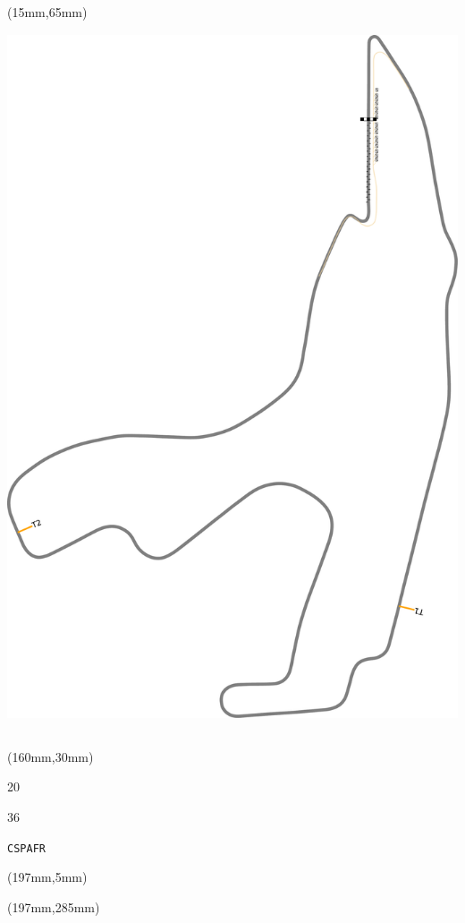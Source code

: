 \begin{textblock*}{185mm}(15mm,65mm)%
\centering
\mbox{\includegraphics[width=185mm,height=210mm,keepaspectratio]{PT/CSPAFR.pdf}}
\end{textblock*}
\begin{textblock*}{40mm}(160mm,30mm)%
\Large
\par{} 
\par20 
\par36 
\par\hfill\tiny\tt CSPAFR\\
\end{textblock*}
\begin{textblock*}{20mm}(197mm,5mm)%
\fbox{\thepage}
\label{CSPAFR}
\end{textblock*}
\begin{textblock*}{20mm}(197mm,285mm)%
\fbox{\thepage}
\end{textblock*}

